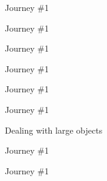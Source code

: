 \documentclass[10pt]{beamer}
\begin{document}
\begin{frame}{Journey \#1}
    \begin{block}{}
		
	\end{block}
\end{frame}

\begin{frame}{Journey \#1}
    \begin{block}{}
		
	\end{block}
\end{frame}



\begin{frame}{Journey \#1}
    \begin{block}{}
		
	\end{block}
\end{frame}

\begin{frame}{Journey \#1}
    \begin{block}{}
		
	\end{block}
\end{frame}


\begin{frame}{Journey \#1}
    \begin{block}{}
		
	\end{block}
\end{frame}

\begin{frame}{Journey \#1}
    \begin{block}{Dealing with large objects}
		
	\end{block}
\end{frame}

\begin{frame}{Journey \#1}
    \begin{block}{}
		
	\end{block}
\end{frame}

\begin{frame}{Journey \#1}
    \begin{block}{}
		
	\end{block}
\end{frame}
\end{document}
